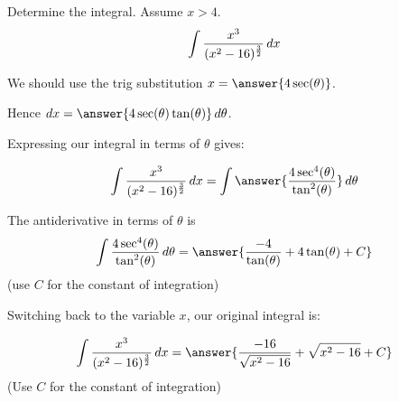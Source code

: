 \documentclass{ximera}
\author{Jason Miller}
\begin{document}
\begin{exercise}
Determine the integral. Assume $x > 4$. 
\[
\int \frac{x^3}{(x^2-16)^{\frac{3}{2}}}  \mathop{}\!d x
\]

We should use the trig substitution $x=\answer{4\sec(\theta)}$. 

Hence $\d x=\answer{4 \sec(\theta)\tan(\theta) } \d \theta$.

Expressing our integral in terms of $\theta$ gives:

\begin{exercise}

\[
\int \frac{x^{3}}{(x^{2}-16)^{\frac{3}{2}}} \d x =\int \answer{ \frac{4 \sec^{4}(\theta)}{\tan^{2}(\theta)} } \d \theta
\]


\begin{exercise}
The antiderivative in terms of $\theta$ is 
\[
\int  \frac{4 \sec^{4}(\theta)}{\tan^{2}(\theta)}  \d \theta =\answer{  \frac{-4}{\tan(\theta)} + 4\tan(\theta)  +C  } 
\]
(use $C$ for the constant of integration)

\begin{exercise}
Switching back to the variable $x$, our original integral is:

\[
\int \frac{x^{3}}{(x^{2}-16)^{\frac{3}{2}}} \d x= \answer{\frac{-16}{\sqrt{x^{2}-16}} + \sqrt{x^{2}-16} + C }
\]
(Use $C$ for the constant of integration)

\end{exercise}
\end{exercise}
\end{exercise}
\end{exercise}
\end{document}
